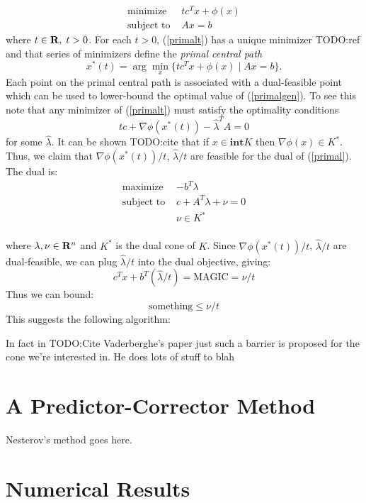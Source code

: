 \documentclass{article}
\begin{document}
\begin{equation}\label{primalt}
  \begin{array}{ll}
    \mbox{minimize}    & tc^Tx + \phi(x)\\
    \mbox{subject to } & Ax = b
  \end{array}
\end{equation}
where $t \in \mathbf{R},\;t >0$. For each $t >0$, (\ref{primalt}) has a unique minimizer TODO:ref
and that series of minimizers define the \emph{primal central path}
\[
  x^*(t) = \arg\min_x\{tc^Tx + \phi(x) \mid Ax=b\}.
\]
Each point on the primal central path is associated with a dual-feasible point which
can be used to lower-bound the optimal value of (\ref{primalgen}). To see this note that
any minimizer of (\ref{primalt}) must satisfy the optimality conditions
\[
  tc + \nabla\phi(x^*(t)) - \hat{\lambda}^TA = 0
\]
for some $\hat{\lambda}$. It can be shown TODO:cite that if  $x \in \mathbf{int} K$ then
$\nabla\phi(x) \in K^*$. Thus, we claim that $\nabla\phi(x^*(t))/t$, $\hat{\lambda}/t$
are feasible for the dual of (\ref{primal}). The dual is:
\begin{equation}\label{dual}
  \begin{array}{ll}
    \mbox{maximize}    & -b^T\lambda \\
    \mbox{subject to } & c + A^T\lambda + \nu = 0 \\
                       & \nu \in K^* \\
  \end{array}
\end{equation}

where $\lambda, \nu \in \mathbf{R}^n$ and $K^*$ is the dual cone of $K$. Since 
$\nabla\phi(x^*(t))/t$, $\hat{\lambda}/t$ are dual-feasible, we can plug $\hat{\lambda}/t$
into the dual objective, giving:
\[
  c^Tx + b^T(\hat{\lambda}/t) =   \text{MAGIC} = \nu/t
\]
Thus we can bound:
\[
  \text{something} \leq \nu/t 
\]
This suggests the following algorithm:


In fact in TODO:Cite Vaderberghe's paper just such a barrier is proposed for the cone we're
interested in. He does lots of stuff to blah 

\section{A Predictor-Corrector Method}
Nesterov's method goes here.
\section{Numerical Results}
\end{document}
